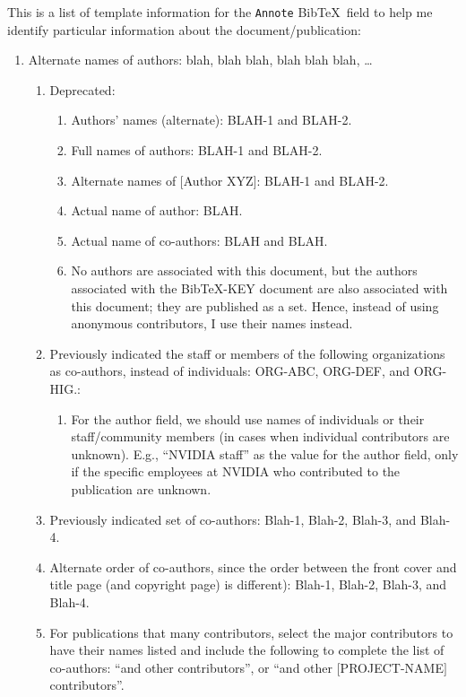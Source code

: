 \documentclass[letter,12pt]{article}
\begin{document}
This is a list of template information for the {\tt Annote} {\sc Bib}\TeX\ field to help me identify particular information about the document/publication: \vspace{-0.3cm}
\begin{enumerate} \itemsep -4pt
\item Alternate names of authors: blah, blah blah, blah blah blah, \dots \vspace{-0.3cm}
	\begin{enumerate} \itemsep -2pt
	\item Deprecated: \vspace{-0.2cm}
		\begin{enumerate} \itemsep -2pt
		\item Authors' names (alternate): BLAH-1 and BLAH-2.
		\item Full names of authors: BLAH-1 and BLAH-2.
		\item Alternate names of $[$Author XYZ$]$: BLAH-1 and BLAH-2.
		\item Actual name of author: BLAH.
		\item Actual name of co-authors: BLAH and BLAH.
		\item No authors are associated with this document, but the authors associated with the BibTeX-KEY document are also associated with this document; they are published as a set. Hence, instead of using anonymous contributors, I use their names instead.
		\end{enumerate}
	\item Previously indicated the staff or members of the following organizations as co-authors, instead of individuals: ORG-ABC, ORG-DEF, and ORG-HIG.: \vspace{-0.2cm}
		\begin{enumerate} \itemsep -2pt
		\item For the author field, we should use names of individuals or their staff/community members (in cases when individual contributors are unknown). E.g., ``NVIDIA staff'' as the value for the author field, only if the specific employees at NVIDIA who contributed to the publication are unknown.
		\end{enumerate}
	\item Previously indicated set of co-authors: Blah-1, Blah-2, Blah-3, and Blah-4.
	\item Alternate order of co-authors, since the order between the front cover and title page (and copyright page) is different): Blah-1, Blah-2, Blah-3, and Blah-4.
	\item For publications that many contributors, select the major contributors to have their names listed and include the following to complete the list of co-authors: ``and other contributors'', or ``and other $[$PROJECT-NAME$]$ contributors''.

\end{enumerate}
\end{enumerate}
\end{document}
